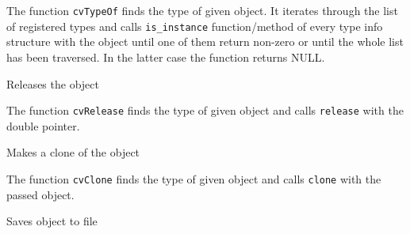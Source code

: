 \begin{description}
\end{description}

The function \texttt{cvTypeOf} finds the type of given object. It iterates
through the list of registered types and calls \texttt{is\_instance}
function/method of every type info structure with the object until one
of them return non-zero or until the whole list has been traversed. In
the latter case the function returns NULL.

\label{Release}

Releases the object


\begin{description}
\end{description}

The function \texttt{cvRelease} finds the type of given object and calls \texttt{release} with the double pointer.

\label{Clone}

Makes a clone of the object


\begin{description}
\end{description}

The function \texttt{cvClone} finds the type of given object and calls \texttt{clone} with the passed object.

\label{Save}

Saves object to file


